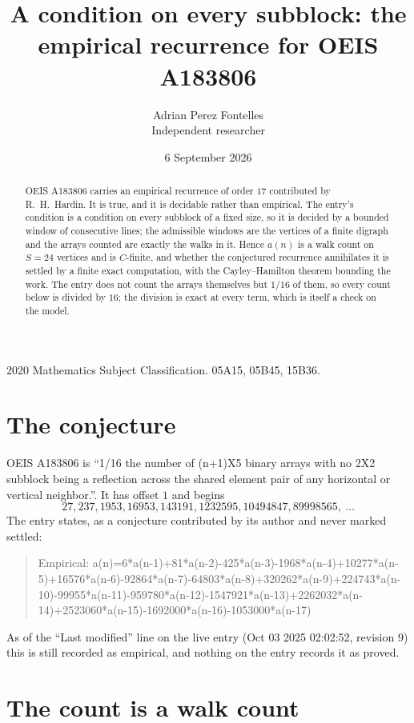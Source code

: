 \documentclass[11pt,a4paper]{article}
\title{A condition on every subblock: the empirical recurrence for OEIS A183806}
\author{Adrian Perez Fontelles\\ \small Independent researcher}
\date{6 September 2026}
\theoremstyle{plain}
\theoremstyle{definition}
\begin{document}
\maketitle

\begin{abstract}
OEIS A183806 carries an empirical recurrence of order $17$ contributed by R.~H.~Hardin. It is
true, and it is decidable rather than empirical. The entry's condition is a condition on every
subblock of a fixed size, so it is decided by a bounded window of consecutive lines; the
admissible windows are the vertices of a finite digraph and the arrays counted are exactly the
walks in it. Hence $a(n)$ is a walk count on $S=24$ vertices and is $C$-finite, and whether the
conjectured recurrence annihilates it is settled by a finite exact computation, with the
Cayley--Hamilton theorem bounding the work. The entry does not count the arrays themselves but $1/16$ of them, so every count below is divided by $16$; the division is exact at every term, which is itself a check on the model.
\end{abstract}

\noindent\small 2020 Mathematics Subject Classification. 05A15, 05B45, 15B36.\normalsize

\section{The conjecture}

OEIS A183806 is ``1/16 the number of (n+1)X5 binary arrays with no 2X2 subblock being a reflection across the shared element pair of any horizontal or vertical neighbor.''. It has offset $1$ and begins
\[
27, 237, 1953, 16953, 143191, 1232595, 10494847, 89998565,\ \dots
\]
The entry states, as a conjecture contributed by its author and never marked settled:
\begin{quote}
Empirical: a(n)=6*a(n-1)+81*a(n-2)-425*a(n-3)-1968*a(n-4)+10277*a(n-5)+16576*a(n-6)-92864*a(n-7)-64803*a(n-8)+320262*a(n-9)+224743*a(n-10)-99955*a(n-11)-959780*a(n-12)-1547921*a(n-13)+2262032*a(n-14)+2523060*a(n-15)-1692000*a(n-16)-1053000*a(n-17)
\end{quote}
As of the ``Last modified'' line on the live entry (Oct 03 2025 02:02:52, revision 9) this is still
recorded as empirical, and nothing on the entry records it as proved.

\section{The count is a walk count}
\end{document}
